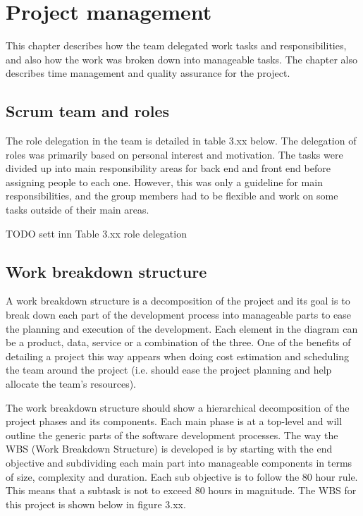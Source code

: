 
\chapter{Project management}

This chapter describes how the team delegated work tasks and responsibilities, and also how the work was broken down into manageable tasks. The chapter also describes time management and quality assurance for the project.

\section{Scrum team and roles}

The role delegation in the team is detailed in table 3.xx below. The delegation of roles was primarily based on personal interest and motivation. The tasks were divided up into main responsibility areas for back end and front end before assigning people to each one. However, this was only  a guideline for main responsibilities, and the group members had to be flexible and work on some tasks outside of their main areas.

TODO sett inn Table 3.xx role delegation\newline

\section{Work breakdown structure}

A work breakdown structure is a decomposition of the project and its goal is to break down each part of the development process into manageable parts to ease the planning and execution of the development. Each element in the diagram can be a product, data, service or a combination of the three. One of the benefits of detailing a project this way appears when doing cost estimation and scheduling the team around the project (i.e. should ease the project planning and help allocate the team’s resources).\newline

The work breakdown structure should show a hierarchical decomposition of the project phases and its components. Each main phase is at a top-level and will outline the generic parts of the software development processes. The way the WBS (Work Breakdown Structure) is developed is by starting with the end objective and subdividing each main part into manageable components in terms of size, complexity and duration. Each sub objective is to follow the 80 hour rule. This means that a subtask is not to exceed 80 hours in magnitude.  The WBS for this project is shown below in figure 3.xx.

